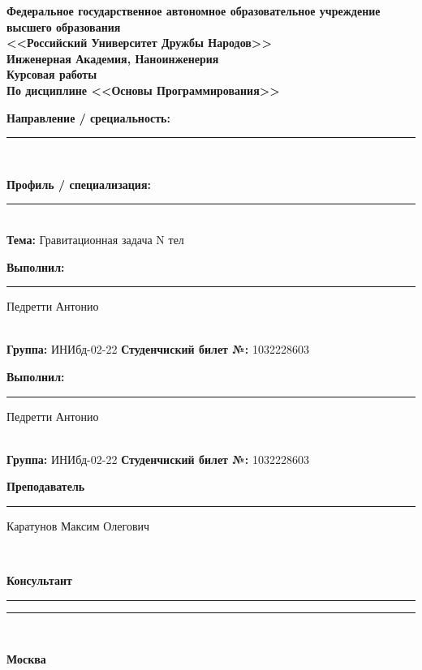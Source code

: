 \documentclass{article}
\begin{document}
  \begin{titlepage}
    \begin{center}
    \textbf{Федеральное государственное автономное образовательное учреждение высшего образования\\ <<Российский Университет Дружбы Народов>>\\[1.5pt]Инженерная Академия, Наноинженерия}\\ 
      \vfill
      {\bfseries Курсовая работы}\\[.5em]
      {\bfseries По дисциплине <<Основы Программирования>>}\\[.5em]
      \vspace{2em}
      {\bfseries Направление / срециальность: \rule{0.4\linewidth}{0.4pt}}\\
      {\bfseries Профиль / специализация: \rule{0.47\linewidth}{0.4pt}}\\
      \vspace{2em}
      {\textbf{Тема:} Гравитационная задача N тел}\\
    \end{center}
    \vspace{4em}
    \begin{flushleft}
      {\textbf{Выполнил:} \rule{0.2\textwidth}{0.4pt} \space Педретти Антонио}\\
      {\textbf{Группа:} ИНИбд-02-22 \hspace{30pt}\textbf{Студенчиский билет №:} 1032228603}\\[3em]
      {\textbf{Выполнил:} \rule{0.2\textwidth}{0.4pt} \space Педретти Антонио}\\
      {\textbf{Группа:} ИНИбд-02-22 \hspace{30pt}\textbf{Студенчиский билет №:} 1032228603}\\[3em]
      {\textbf{Преподаватель} \rule{0.2\textwidth}{0.4pt} \space Каратунов Максим Олегович}\\
      {\textbf{Консультант} \rule{0.2\textwidth}{0.4pt} \space \rule{0.45\linewidth}{0.4pt}}\\
      \vfill
    \end{flushleft}
    \begin{center}
      \bfseries Москва \the\year{} \\
    \end{center}
  \end{titlepage}
\end{document}

